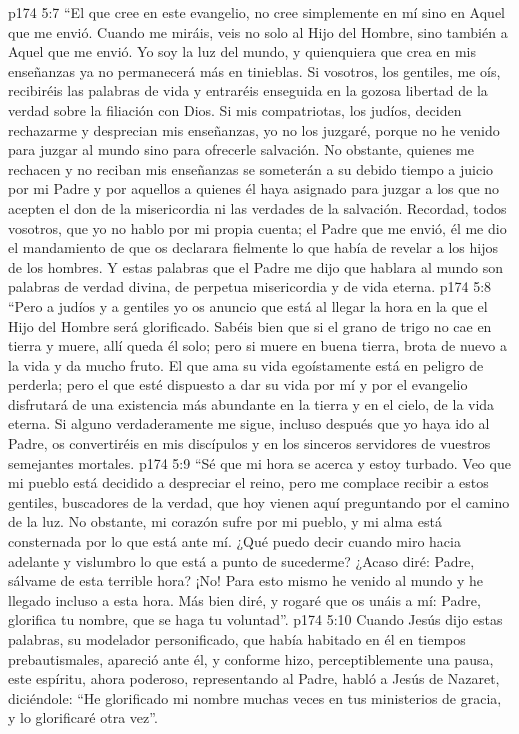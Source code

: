 \vs p174 5:7 \pc “El que cree en este evangelio, no cree simplemente en mí sino en Aquel que me envió. Cuando me miráis, veis no solo al Hijo del Hombre, sino también a Aquel que me envió. Yo soy la luz del mundo, y quienquiera que crea en mis enseñanzas ya no permanecerá más en tinieblas. Si vosotros, los gentiles, me oís, recibiréis las palabras de vida y entraréis enseguida en la gozosa libertad de la verdad sobre la filiación con Dios. Si mis compatriotas, los judíos, deciden rechazarme y desprecian mis enseñanzas, yo no los juzgaré, porque no he venido para juzgar al mundo sino para ofrecerle salvación. No obstante, quienes me rechacen y no reciban mis enseñanzas se someterán a su debido tiempo a juicio por mi Padre y por aquellos a quienes él haya asignado para juzgar a los que no acepten el don de la misericordia ni las verdades de la salvación. Recordad, todos vosotros, que yo no hablo por mi propia cuenta; el Padre que me envió, él me dio el mandamiento de que os declarara fielmente lo que había de revelar a los hijos de los hombres. Y estas palabras que el Padre me dijo que hablara al mundo son palabras de verdad divina, de perpetua misericordia y de vida eterna.
\vs p174 5:8 “Pero a judíos y a gentiles yo os anuncio que está al llegar la hora en la que el Hijo del Hombre será glorificado. Sabéis bien que si el grano de trigo no cae en tierra y muere, allí queda él solo; pero si muere en buena tierra, brota de nuevo a la vida y da mucho fruto. El que ama su vida egoístamente está en peligro de perderla; pero el que esté dispuesto a dar su vida por mí y por el evangelio disfrutará de una existencia más abundante en la tierra y en el cielo, de la vida eterna. Si alguno verdaderamente me sigue, incluso después que yo haya ido al Padre, os convertiréis en mis discípulos y en los sinceros servidores de vuestros semejantes mortales.
\vs p174 5:9 “Sé que mi hora se acerca y estoy turbado. Veo que mi pueblo está decidido a despreciar el reino, pero me complace recibir a estos gentiles, buscadores de la verdad, que hoy vienen aquí preguntando por el camino de la luz. No obstante, mi corazón sufre por mi pueblo, y mi alma está consternada por lo que está ante mí. ¿Qué puedo decir cuando miro hacia adelante y vislumbro lo que está a punto de sucederme? ¿Acaso diré: Padre, sálvame de esta terrible hora? ¡No! Para esto mismo he venido al mundo y he llegado incluso a esta hora. Más bien diré, y rogaré que os unáis a mí: Padre, glorifica tu nombre, que se haga tu voluntad”.
\vs p174 5:10 Cuando Jesús dijo estas palabras, su modelador personificado, que había habitado en él en tiempos prebautismales, apareció ante él, y conforme hizo, perceptiblemente una pausa, este espíritu, ahora poderoso, representando al Padre, habló a Jesús de Nazaret, diciéndole: “He glorificado mi nombre muchas veces en tus ministerios de gracia, y lo glorificaré otra vez”.
